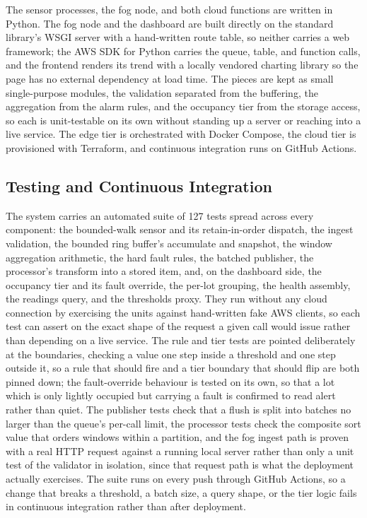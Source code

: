 \documentclass[conference]{IEEEtran}
\begin{document}
The sensor processes, the fog node, and both cloud functions are written in Python. The fog node and the dashboard are built directly on the standard library's WSGI server with a hand-written route table, so neither carries a web framework; the AWS SDK for Python carries the queue, table, and function calls, and the frontend renders its trend with a locally vendored charting library so the page has no external dependency at load time. The pieces are kept as small single-purpose modules, the validation separated from the buffering, the aggregation from the alarm rules, and the occupancy tier from the storage access, so each is unit-testable on its own without standing up a server or reaching into a live service. The edge tier is orchestrated with Docker Compose, the cloud tier is provisioned with Terraform, and continuous integration runs on GitHub Actions.

\subsection{Testing and Continuous Integration}

The system carries an automated suite of 127 tests spread across every component: the bounded-walk sensor and its retain-in-order dispatch, the ingest validation, the bounded ring buffer's accumulate and snapshot, the window aggregation arithmetic, the hard fault rules, the batched publisher, the processor's transform into a stored item, and, on the dashboard side, the occupancy tier and its fault override, the per-lot grouping, the health assembly, the readings query, and the thresholds proxy. They run without any cloud connection by exercising the units against hand-written fake AWS clients, so each test can assert on the exact shape of the request a given call would issue rather than depending on a live service. The rule and tier tests are pointed deliberately at the boundaries, checking a value one step inside a threshold and one step outside it, so a rule that should fire and a tier boundary that should flip are both pinned down; the fault-override behaviour is tested on its own, so that a lot which is only lightly occupied but carrying a fault is confirmed to read alert rather than quiet. The publisher tests check that a flush is split into batches no larger than the queue's per-call limit, the processor tests check the composite sort value that orders windows within a partition, and the fog ingest path is proven with a real HTTP request against a running local server rather than only a unit test of the validator in isolation, since that request path is what the deployment actually exercises. The suite runs on every push through GitHub Actions, so a change that breaks a threshold, a batch size, a query shape, or the tier logic fails in continuous integration rather than after deployment.
\end{document}
